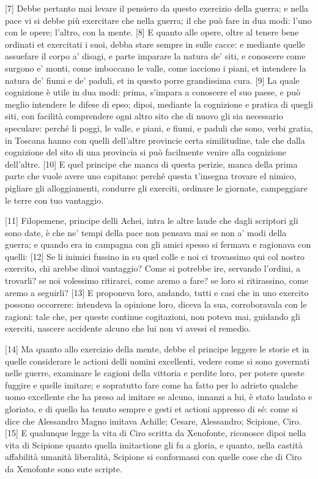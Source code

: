 {[}7{]} Debbe pertanto mai levare il pensiero da questo exercizio della
guerra; e nella pace vi si debbe più exercitare che nella guerra; il che
può fare in dua modi: l'uno con le opere; l'altro, con la mente. {[}8{]}
E quanto alle opere, oltre al tenere bene ordinati et exercitati i suoi,
debba stare sempre in sulle cacce: e mediante quelle assuefare il corpo
a' disagi, e parte imparare la natura de' siti, e conoscere come surgono
e' monti, come imboccano le valle, come iacciono i piani, et intendere
la natura de' fiumi e de' paduli, et in questo porre grandissima cura.
{[}9{]} La quale cognizione è utile in dua modi: prima, s'impara a
conoscere el suo paese, e può meglio intendere le difese di epso; dipoi,
mediante la cognizione e pratica di quegli siti, con facilità
comprendere ogni altro sito che di nuovo gli sia necessario speculare:
perché li poggi, le valle, e piani, e fiumi, e paduli che sono, verbi
gratia, in Toscana hanno con quelli dell'altre provincie certa
similitudine, tale che dalla cognizione del sito di una provincia si può
facilmente venire alla cognizione dell'altre. {[}10{]} E quel principe
che manca di questa perizie, manca della prima parte che vuole avere uno
capitano: perché questa t'insegna trovare el nimico, pigliare gli
alloggiamenti, condurre gli exerciti, ordinare le giornate, campeggiare
le terre con tuo vantaggio.

\quebra

{[}11{]} Filopemene, principe delli Achei, intra le altre laude che
dagli scriptori gli sono date, è che ne' tempi della pace non pensava
mai se non a' modi della guerra; e quando era in campagna con gli amici
spesso si fermava e ragionava con quelli: {[}12{]} Se li inimici fussino
in su quel colle e noi ci trovassimo qui col nostro exercito, chi arebbe
dinoi vantaggio? Come si potrebbe ire, servando l'ordini, a trovarli? se
noi volessimo ritirarci, come aremo a fare? se loro si ritirassino, come
aremo a seguirli? {[}13{]} E proponeva loro, andando, tutti e casi che
in uno exercito possono occorrere: intendeva la opinione loro, diceva la
sua, corroboravala con le ragioni: tale che, per queste continue
cogitazioni, non poteva mai, guidando gli exerciti, nascere accidente
alcuno che lui non vi avessi el remedio.

{[}14{]} Ma quanto allo exercizio della mente, debbe el principe leggere
le storie et in quelle considerare le actioni delli uomini excellenti,
vedere come si sono governati nelle guerre, examinare le cagioni della
vittoria e perdite loro, per potere queste fuggire e quelle imitare; e
sopratutto fare come ha fatto per lo adrieto qualche uomo excellente che
ha preso ad imitare se alcuno, innanzi a lui, è stato laudato e
gloriato, e di quello ha tenuto sempre e gesti et actioni appresso di
sé: come si dice che Alessandro Magno imitava Achille; Cesare,
Alessandro; Scipione, Ciro. {[}15{]} E qualunque legge la vita di Ciro
scritta da Xenofonte, riconosce dipoi nella vita di Scipione quanto
quella imitactione gli fu a gloria, e quanto, nella castità affabilità
umanità liberalità, Scipione si conformassi con quelle cose che di Ciro
da Xenofonte sono sute scripte.

